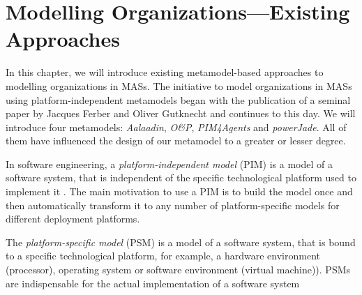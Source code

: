
\chapter{Modelling Organizations---Existing Approaches}

In this chapter, we will introduce existing metamodel-based approaches to modelling organizations in MASs.
The initiative to model organizations in MASs using platform-independent metamodels began with the publication of a seminal paper \cite{Ferber98} by Jacques Ferber and Oliver Gutknecht and continues to this day.
We will introduce four metamodels: \textit{Aalaadin}, \textit{O\&P}, \textit{PIM4Agents} and \textit{powerJade}.
All of them have influenced the design of our metamodel to a greater or lesser degree.

In software engineering, a \textit{platform-independent model} (PIM) is a model of a software system, that is independent of the specific technological platform used to implement it \cite{Wikipedia-PIM}.
The main motivation to use a PIM is to build the model once and then automatically transform it to any number of platform-specific models for different deployment platforms.

The \textit{platform-specific model} (PSM) is a model of a software system, that is bound to a specific technological platform, for example, a hardware environment (processor), operating system or software environment (virtual machine)).
PSMs are indispensable for the actual implementation of a software system \cite{Wikipedia-PSM}

